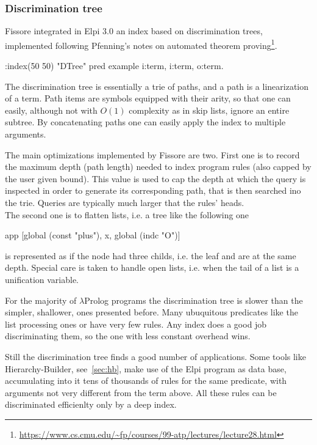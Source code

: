 \documentclass[a4paper, 11pt]{book}
\begin{document}
\subsubsection{Discrimination tree}

Fissore integrated in Elpi 3.0 an index based on discrimination trees,
implemented following Pfenning's notes on automated theorem
proving\footnote{\url{https://www.cs.cmu.edu/~fp/courses/99-atp/lectures/lecture28.html}}.

\begin{elpicode}
:index(50 50) "DTree" %
pred example i:term, i:term, o:term.
\end{elpicode}

The discrimination tree is essentially a trie of paths, and a path is a
linearization of a term. Path items are symbols equipped with
their arity, so that one can easily, although not with $O(1)$ complexity
as in skip lists, ignore an entire subtree.
By concatenating paths one can easily apply the index to multiple arguments.

The main optimizations implemented by Fissore are two.
First one is to record the maximum depth (path length) needed to index
program rules (also capped by the user given bound). This value is used to cap
the depth at which the query is inspected in order to generate its corresponding
path, that is then searched ino the trie. Queries are typically much larger
that the rules' heads.\\
The second one is to flatten lists, i.e.
a tree like the following one
\begin{elpicode}
app [global (const "plus"), x, global (indc "O")]
\end{elpicode}
\noindent
is represented as if the  node had three childs, i.e.
the leaf  and  are at the same depth.
Special care is taken to handle open lists, i.e. when the tail of a list
is a unification variable.

For the majority of $\lambda$Prolog programs the discrimination tree is slower
than the simpler, shallower, ones presented before. Many ubuquitous predicates
like the list processing ones  or  have very few rules. Any
index does a good job discriminating them, so the one with less constant
overhead wins.

Still the discrimination tree finds a good number of applications.
Some tools like Hierarchy-Builder, see~\cref{sec:hb},
make use of the Elpi program as data base, accumulating into it tens of
thousands of rules for the same predicate, with arguments not
very different from the term above. All these rules can be discriminated
efficienlty only by a deep index.
\end{document}
